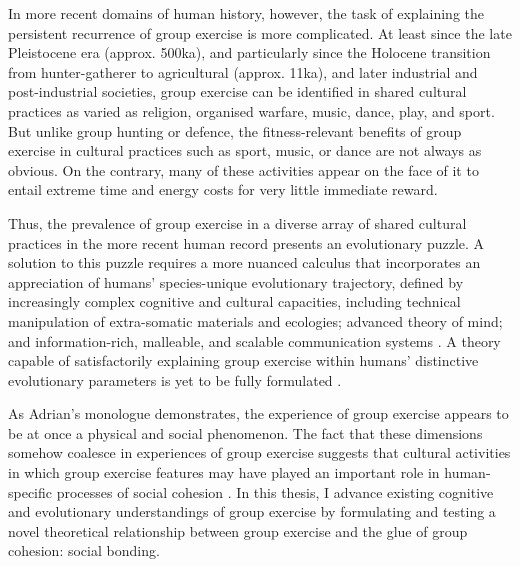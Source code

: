 \begin{CJK}{UTF8}{gbsn}
In more recent domains of human history, however, the task of explaining the persistent recurrence of group exercise is more complicated.  At least since the late Pleistocene era (approx. 500ka), and particularly since the Holocene transition from hunter-gatherer to agricultural (approx. 11ka), and later industrial and post-industrial societies, group exercise can be identified in shared cultural practices as varied as religion, organised warfare, music, dance, play, and sport.  But unlike group hunting or defence, the fitness-relevant benefits of group exercise in cultural practices such as sport, music, or dance are not always as obvious.  On the contrary, many of these activities appear on the face of it to entail extreme time and energy costs for very little immediate reward.

Thus, the prevalence of group exercise in a diverse array of shared cultural practices in the more recent human record presents an evolutionary puzzle.  A solution to this puzzle requires a more nuanced calculus that incorporates an appreciation of humans' species-unique evolutionary trajectory, defined by increasingly complex cognitive and cultural capacities, including technical manipulation of extra-somatic materials and ecologies; advanced theory of mind; and information-rich, malleable, and scalable communication systems \citep{Roepstorff2010,Clark2015,Fuentes2016}.  A theory capable of satisfactorily explaining group exercise within humans' distinctive evolutionary parameters is yet to be fully formulated \citep{Cohen2017}.

As Adrian's monologue demonstrates, the experience of group exercise appears to be at once a physical and social phenomenon.  The fact that these dimensions somehow coalesce in experiences of group exercise suggests that cultural activities in which group exercise features may have played an important role in human-specific processes of social cohesion \citep{Dunbar2010,Whitehouse2004,Cohen2017}.  In  this thesis, I advance existing cognitive and evolutionary understandings of group exercise by formulating and testing a novel theoretical relationship between group exercise and the glue of group cohesion: social bonding.


\end{CJK}
